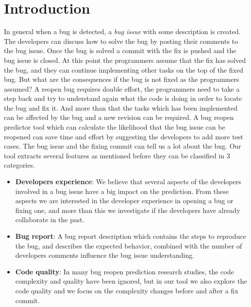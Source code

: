 \documentclass[sigconf,review]{acmart}
\begin{document}
\section{Introduction}
In general when a bug is detected, a \emph{bug issue} with some description is created. The developers can discuss how to solve the bug by posting their comments to the bug issue.
Once the bug is solved a commit with the fix is pushed and the bug issue is closed. At this point the programmers assume that the fix has solved the bug, and they can continue implementing other tasks on the top of the fixed bug. But what are the consequences if the bug is not fixed as the programmers assumed? A reopen bug requires double effort, the programmers need to take a step back and try to understand again what the code is doing in order to locate the bug and fix it. And more than that the tasks which has been implemented can be affected by the bug and a new revision can be required. A bug reopen predictor tool which can calculate the likelihood that the bug issue can be reopened can save time and effort by suggesting the developers to add more test cases.
The bug issue and the fixing commit can tell us a lot about the bug. Our tool extracts several features as mentioned before they can be classified in 3 categories.
	\begin{itemize}
		\item \textbf{Developers experience}: We believe that several aspects of the developers involved in a bug issue have a big impact on the prediction. From these aspects we are interested in the developer experience in opening a bug or fixing one, and more than this we investigate if the developers have already collaborate in the past.
		\item \textbf{Bug report}: A bug report description which contains the steps to reproduce the bug, and describes the expected behavior, combined with the number of developers comments influence the bug issue understanding.
		\item \textbf{Code quality}: In many bug reopen prediction research studies, the code complexity and quality have been ignored, but in our tool we also explore the code quality and we focus on the complexity changes before and after a fix commit.

	\end{itemize}

\end{document}
